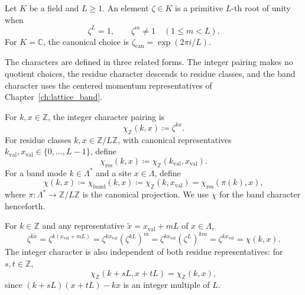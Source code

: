 \begin{definition}
Let $K$ be a field and $L\ge1$. An element $\zeta\in K$ is a primitive $L$-th root of unity when
\begin{equation}
\zeta^L=1,\qquad \zeta^m\ne1\quad(1\le m<L).
\end{equation}
For $K=\mathbb C$, the canonical choice is $\zeta_{\mathrm{can}}=\exp(2\pi i/L)$.
\end{definition}

The characters are defined in three related forms. The integer pairing makes no quotient choices, the residue character descends to residue classes, and the band character uses the centered momentum representatives of Chapter~\ref{ch:lattice_band}.

\begin{definition}
For $k,x\in\mathbb Z$, the integer character pairing is
\begin{equation}
\chi_{\mathbb Z}(k,x)\coloneqq\zeta^{kx}.
\end{equation}
For residue classes $k,x\in\mathbb Z/L\mathbb Z$, with canonical representatives $k_{\mathrm{val}},x_{\mathrm{val}}\in\{0,\ldots,L-1\}$, define
\begin{equation}
\chi_{\mathrm{res}}(k,x)\coloneqq\chi_{\mathbb Z}(k_{\mathrm{val}},x_{\mathrm{val}}).
\end{equation}
For a band mode $k\in\Lambda^*$ and a site $x\in\Lambda$, define
\begin{equation}
\chi(k,x)\coloneqq\chi_{\mathrm{band}}(k,x)\coloneqq\chi_{\mathbb Z}(k,x_{\mathrm{val}})
=\chi_{\mathrm{res}}(\pi(k),x),
\end{equation}
where $\pi:\Lambda^*\to\mathbb Z/L\mathbb Z$ is the canonical projection. We use $\chi$ for the band character henceforth.
\end{definition}

\begin{lemma}
\label{lem:rep_independence}
For $k\in\mathbb Z$ and any representative $\widetilde{x}=x_{\mathrm{val}}+mL$ of $x\in\Lambda$,
\begin{equation}
\zeta^{k\widetilde{x}}=\zeta^{k(x_{\mathrm{val}}+mL)}=\zeta^{kx_{\mathrm{val}}}(\zeta^{kL})^m
=\zeta^{kx_{\mathrm{val}}}(\zeta^L)^{km}=\zeta^{kx_{\mathrm{val}}}=\chi(k,x).
\end{equation}
The integer character is also independent of both residue representatives: for $s,t\in\mathbb Z$,
\begin{equation}
\chi_{\mathbb Z}(k+sL,x+tL)=\chi_{\mathbb Z}(k,x),
\end{equation}
since $(k+sL)(x+tL)-kx$ is an integer multiple of $L$.
\end{lemma}

